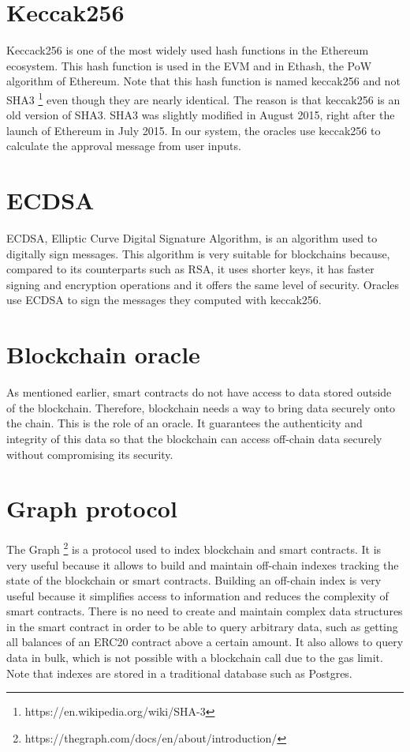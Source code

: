 \documentclass[a4paper,11pt,oneside]{report}
\begin{document}
\section{Keccak256}
Keccack256 is one of the most widely used hash functions in the Ethereum ecosystem. This hash function is used in the EVM and in Ethash, the PoW algorithm of Ethereum. Note that this hash function is named keccak256 and not SHA3 \footnote{https://en.wikipedia.org/wiki/SHA-3} even though they are nearly identical. The reason is that keccak256 is an old version of SHA3. SHA3 was slightly modified in August 2015, right after the launch of Ethereum in July 2015. In our system, the oracles use keccak256 to calculate the approval message from user inputs.

\section{ECDSA}
ECDSA, Elliptic Curve Digital Signature Algorithm, is an algorithm used to digitally sign messages. This algorithm is very suitable for blockchains because, compared to its counterparts such as RSA, it uses shorter keys, it has faster signing and encryption operations and it offers the same level of security. Oracles use ECDSA to sign the messages they computed with keccak256.

\section{Blockchain oracle}
As mentioned earlier, smart contracts do not have access to data stored outside of the blockchain. Therefore, blockchain needs a way to bring data securely onto the chain. This is the role of an oracle. It guarantees the authenticity and integrity of this data so that the blockchain can access off-chain data securely without compromising its security.

\section{Graph protocol}
The Graph \footnote{https://thegraph.com/docs/en/about/introduction/} is a protocol used to index blockchain and smart contracts. It is very useful because it allows to build and maintain off-chain indexes tracking the state of the blockchain or smart contracts. Building an off-chain index is very useful because it simplifies access to information and reduces the complexity of smart contracts. There is no need to create and maintain complex data structures in the smart contract in order to be able to query arbitrary data, such as getting all balances of an ERC20 contract above a certain amount. It also allows to query data in bulk, which is not possible with a blockchain call due to the gas limit. Note that indexes are stored in a traditional database such as Postgres.
\end{document}
